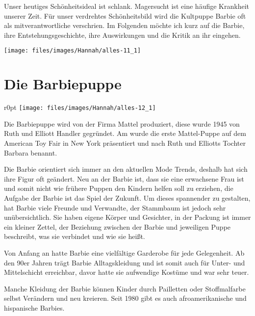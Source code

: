 Unser heutiges Schönheitsideal ist schlank. Magersucht ist eine häufige Krankheit unserer Zeit. Für
unser verdrehtes Schönheitsbild wird die Kultpuppe Barbie oft als mitverantwortliche verschrien. Im
Folgenden
möchte ich kurz auf die Barbie, ihre Entstehungsgeschichte, ihre Auswirkungen und die Kritik an ihr
eingehen.

\bigskip
\begin{figurewrapper}
	\texttt{[image: files/images/Hannah/alles-11\_1]}%
\end{figurewrapper}

\newpage
\section{Die Barbiepuppe}

\begin{wrapfigure}{r}{0pt}
	\texttt{[image: files/images/Hannah/alles-12\_1]}%
\end{wrapfigure}
Die Barbiepuppe wird von der Firma Mattel produziert, diese wurde 1945 von Ruth und Elliott Handler
gegründet.
Am  wurde die erste Mattel-Puppe auf dem American Toy Fair in New York
präsentiert und nach Ruth und Elliotts Tochter Barbara benannt.

Die Barbie orientiert sich immer an den aktuellen Mode Trends, deshalb hat sich ihre Figur oft
geändert.
Neu an der Barbie ist, dass sie eine erwachsene Frau ist und somit nicht wie frühere Puppen den
Kindern helfen soll zu erziehen, die Aufgabe der Barbie ist das Spiel der Zukunft. Um dieses
spannender zu gestalten, hat Barbie viele Freunde und Verwandte, der Stammbaum ist jedoch sehr
unübersichtlich. Sie haben eigene Körper und Gesichter, in der Packung ist immer ein kleiner Zettel,
der Beziehung zwischen der Barbie und jeweiligen Puppe beschreibt, was sie verbindet und wie sie
heißt.

Von Anfang an hatte Barbie eine vielfältige Garderobe für jede Gelegenheit. Ab den 90er Jahren trägt
Barbie Alltagskleidung und ist somit auch für Unter- und Mittelschicht erreichbar, davor hatte sie
aufwendige Kostüme und war sehr teuer.

Manche Kleidung der Barbie können Kinder durch Pailletten oder Stoffmalfarbe selbst Verändern und neu
kreieren. Seit 1980 gibt es auch afroamerikanische und hispanische Barbies.

